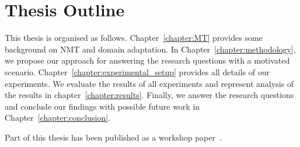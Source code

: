 


\section{Thesis Outline} \label{section:thesis_outline}
This thesis is organised as follows.
Chapter~\ref{chapter:MT} provides some background on NMT and domain adaptation. In Chapter~\ref{chapter:methodology}, we propose our approach for answering the research questions with a motivated scenario. Chapter~\ref{chapter:experimental_setup} provides all details of our experiments. We evaluate the results of all experiments and represent analysis of the results in chapter~\ref{chapter:results}.
Finally, we answer the research questions and conclude our findings with possible future work in Chapter~\ref{chapter:conclusion}. 

Part of this thesis has been published as a workshop paper~\parencite{kim-etal-2021-using}.